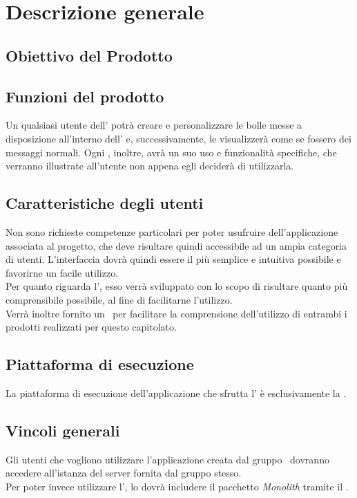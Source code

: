 \section{Descrizione generale}
\subsection{Obiettivo del Prodotto}
\scopoProdotto

\subsection{Funzioni del prodotto}
Un qualsiasi utente dell' potrà creare e personalizzare le bolle messe a disposizione all'interno dell' e, successivamente, le visualizzerà come se fossero dei messaggi normali. Ogni , inoltre, avrà un suo uso e funzionalità specifiche, che verranno illustrate all'utente non appena egli deciderà di utilizzarla.

\subsection{Caratteristiche degli utenti}
Non sono richieste competenze particolari per poter usufruire dell'applicazione associata al progetto, che deve risultare quindi accessibile ad un ampia categoria di utenti. L'interfaccia dovrà quindi essere il più semplice e intuitiva possibile e favorirne un facile utilizzo. \\
Per quanto riguarda l', esso verrà sviluppato con lo scopo di risultare quanto più comprensibile possibile, al fine di facilitarne l'utilizzo. \\
Verrà inoltre fornito un \MU\ per facilitare la comprensione dell'utilizzo di entrambi i prodotti realizzati per questo capitolato.

\subsection{Piattaforma di esecuzione} 
La piattaforma di esecuzione dell'applicazione che sfrutta l' è esclusivamente la  .

\subsection{Vincoli generali}
Gli utenti che vogliono utilizzare l'applicazione creata dal gruppo \gruppo\ dovranno accedere all'istanza del server fornita dal gruppo stesso. \\
Per poter invece utilizzare l', lo  dovrà includere il pacchetto \textit{Monolith} tramite il  . 

\newpage
